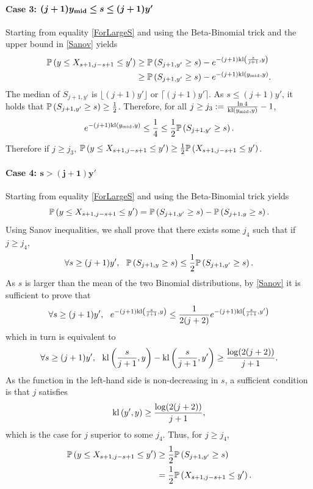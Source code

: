 \paragraph{Case 3: $\bm{(j+1)y_{\mathrm{mid}} \leq s \leq (j+1)y'}$} Starting from equality \eqref{ForLargeS} and using the Beta-Binomial trick and the upper bound in \eqref{Sanov} yields 
\begin{align*}
 \mathbb{P}\left(y \leq X_{s+1,j-s+1} \leq y'\right) & \geq \mathbb{P}\left(S_{j+1,y'} \geq s\right) - e^{-(j+1)\mathrm{kl}\left(\frac{s}{j+1} , y\right)}
\\ & \geq \mathbb{P}\left(S_{j+1,y'} \geq s\right) - e^{-(j+1)\mathrm{kl}\left(y_{\mathrm{mid}} , y\right)}. 
\end{align*}
The median of $S_{j+1,y'}$ is $\lfloor(j+1)y'\rfloor$ or $\lceil(j+1)y'\rceil$. As $s \leq  (j+1)y'$, it holds that $\mathbb{P}\left(S_{j+1,y'} \geq s\right) \geq \frac{1}{2}$. Therefore, for all $j \geq j_3 := \frac{\ln 4}{\mathrm{kl}(y_{\mathrm{mid}},y)}-1$, 
\[e^{-(j+1)\mathrm{kl}\left(y_{\mathrm{mid}} , y\right)} \leq \frac{1}{4} \leq \frac{1}{2}\mathbb{P}\left(S_{j+1,y'} \geq s\right).\]
Therefore if $j \geq j_3$, $\mathbb{P}\left(y \leq X_{s+1,j-s+1} \leq y'\right)  \geq \frac{1}{2}\mathbb{P}\left(X_{s+1,j-s+1} \leq y'\right)$.

\paragraph{Case 4: $\bm{s > (j+1)y'}$} Starting from equality \eqref{ForLargeS} and using the Beta-Binomial trick yields  
\[\mathbb{P}\left(y \leq X_{s+1,j-s+1} \leq y'\right)  =  \mathbb{P}\left(S_{j+1,y'} \geq s\right) - \mathbb{P}\left(S_{j+1,y} \geq s\right).\]
Using Sanov inequalities, we shall prove that there exists some $j_4$ such that if $j\geq j_4$, 
\[\forall s \geq (j+1)y', \ \ \bP\left(S_{j+1,y} \geq s\right) \leq \frac{1}{2}\bP\left(S_{j+1,y'} \geq s\right).\]
As $s$ is larger than the mean of the two Binomial distributions, by \eqref{Sanov} it is sufficient to prove that 
\[\forall s \geq (j+1)y', \ \ e^{-(j+1)\kl\left(\frac{s}{j+1} , y\right)} \leq \frac{1}{2(j+2)}e^{-(j+1)\kl\left(\frac{s}{j+1} , y'\right)}\]
which in turn is equivalent to 
\[\forall s \geq (j+1)y', \ \ \mathrm{kl}\left(\frac{s}{j+1} , y\right)  -  \mathrm{kl}\left(\frac{s}{j+1} , y'\right) \geq \frac{\log(2(j+2))}{j+1}.\]
As the function in the left-hand side is non-decreasing in $s$, a sufficient condition is that $j$ satisfies 
\[ \mathrm{kl}\left(y' , y\right)\geq \frac{\log(2(j+2))}{j+1},\]
which is the case for $j$ superior to some $j_4$. Thus, for $j\geq j_4$, 
\begin{align*}
\mathbb{P}\left(y \leq X_{s+1,j-s+1} \leq y'\right) 
&\geq \frac{1}{2}\mathbb{P}\left(S_{j+1,y'} \geq s\right) 
\\ &= \frac{1}{2}\mathbb{P}\left(X_{s+1,j-s+1} \leq y'\right).
\end{align*}

